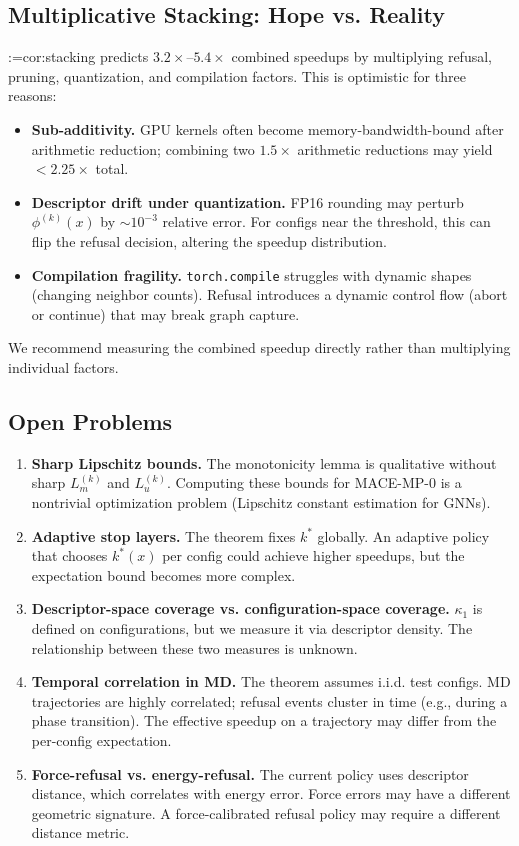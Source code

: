 \documentclass[11pt,a4paper]{article}
\makeatletter
\newcommand{\cref}[1]{\begingroup\def\crefsep{}\@for\crefitem:=#1\do{\crefsep\ref{\crefitem}\def\crefsep{, }}\endgroup}
\newcommand{\Cref}[1]{\cref{#1}}
\makeatother
\begin{document}
\subsection{Multiplicative Stacking: Hope vs. Reality}

\Cref{cor:stacking} predicts $3.2\times$--$5.4\times$ combined speedups by multiplying refusal, pruning, quantization, and compilation factors. This is optimistic for three reasons:
\begin{itemize}
    \item \textbf{Sub-additivity.} GPU kernels often become memory-bandwidth-bound after arithmetic reduction; combining two $1.5\times$ arithmetic reductions may yield $<2.25\times$ total.
    \item \textbf{Descriptor drift under quantization.} FP16 rounding may perturb $\phi^{(k)}(x)$ by $\sim 10^{-3}$ relative error. For configs near the threshold, this can flip the refusal decision, altering the speedup distribution.
    \item \textbf{Compilation fragility.} \texttt{torch.compile} struggles with dynamic shapes (changing neighbor counts). Refusal introduces a dynamic control flow (abort or continue) that may break graph capture.
\end{itemize}
We recommend measuring the combined speedup directly rather than multiplying individual factors.

\subsection{Open Problems}

\begin{enumerate}
    \item \textbf{Sharp Lipschitz bounds.} The monotonicity lemma is qualitative without sharp $L_m^{(k)}$ and $L_u^{(k)}$. Computing these bounds for MACE-MP-0 is a nontrivial optimization problem (Lipschitz constant estimation for GNNs).
    \item \textbf{Adaptive stop layers.} The theorem fixes $k^*$ globally. An adaptive policy that chooses $k^*(x)$ per config could achieve higher speedups, but the expectation bound becomes more complex.
    \item \textbf{Descriptor-space coverage vs. configuration-space coverage.} $\kappa_1$ is defined on configurations, but we measure it via descriptor density. The relationship between these two measures is unknown.
    \item \textbf{Temporal correlation in MD.} The theorem assumes i.i.d. test configs. MD trajectories are highly correlated; refusal events cluster in time (e.g., during a phase transition). The effective speedup on a trajectory may differ from the per-config expectation.
    \item \textbf{Force-refusal vs. energy-refusal.} The current policy uses descriptor distance, which correlates with energy error. Force errors may have a different geometric signature. A force-calibrated refusal policy may require a different distance metric.
\end{enumerate}
\end{document}
